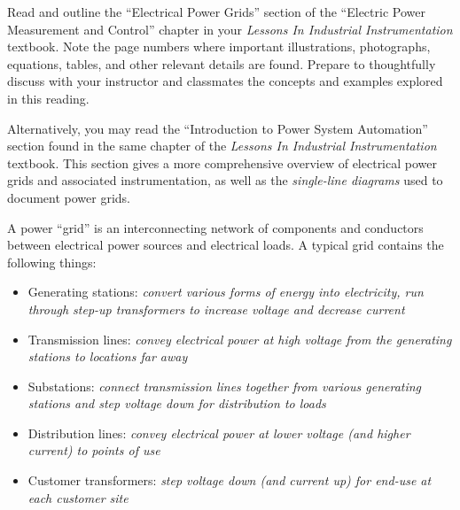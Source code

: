 

Read and outline the ``Electrical Power Grids'' section of the ``Electric Power Measurement and Control'' chapter in your {\it Lessons In Industrial Instrumentation} textbook.  Note the page numbers where important illustrations, photographs, equations, tables, and other relevant details are found.  Prepare to thoughtfully discuss with your instructor and classmates the concepts and examples explored in this reading.

\vskip 10pt

Alternatively, you may read the ``Introduction to Power System Automation'' section found in the same chapter of the {\it Lessons In Industrial Instrumentation} textbook.  This section gives a more comprehensive overview of electrical power grids and associated instrumentation, as well as the {\it single-line diagrams} used to document power grids.













A power ``grid'' is an interconnecting network of components and conductors between electrical power sources and electrical loads.  A typical grid contains the following things:

\begin{itemize}
\item{} Generating stations: {\it convert various forms of energy into electricity, run through step-up transformers to increase voltage and decrease current}
\item{} Transmission lines: {\it convey electrical power at high voltage from the generating stations to locations far away}
\item{} Substations: {\it connect transmission lines together from various generating stations and step voltage down for distribution to loads}
\item{} Distribution lines: {\it convey electrical power at lower voltage (and higher current) to points of use}
\item{} Customer transformers: {\it step voltage down (and current up) for end-use at each customer site}
\end{itemize}

